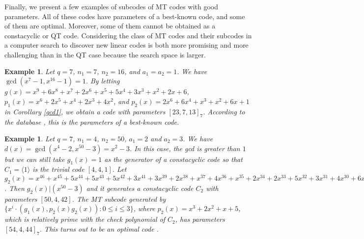 \documentclass[preprint,12pt]{elsarticle}
\newtheorem{Example}[Theorem]{Example}
\begin{document}
Finally, we present a few examples of subcodes of MT codes with good parameters. All of these codes have parameters of a best-known code, and some of them are optimal. Moreover, some of them cannot be obtained as a constacyclic or QT code. Considering the class of MT codes and their subcodes in a computer search to discover new linear codes is both more promising and more challenging than in the QT case because the search space is larger. 

\begin{Example}
Let $q=7$, $n_1=7$, $n_2=16$, and $a_1=a_2=1$. We have $\gcd(x^7-1,x^{16}-1)=1$.
By letting $g(x)= x^9 + 6x^8 + x^7 + 2x^6 + x^5 + 5x^4 + 3x^3 + x^2 + 2x + 6$, 
$p_1(x) =x^6 + 2x^5 + x^4 + 2x^3 + 4x^2$, and $p_2(x) =2x^6 + 6x^4 + x^3 + x^2 + 6x + 1$ in Corollary \ref{gcd1}, we obtain a code with parameters $[23,7,13]_7$. According to the database \cite{table}, this is the parameters of a best-known code. 
\end{Example}


\begin{Example}
Let $q=7$, $n_1=4$, $n_2=50$, $a_1=2$ and $a_2=3$. We have $d(x)=\gcd(x^4-2,x^{50}-3)=x^2-3$. In this case, the gcd is greater than $1$ but we can still take $g_1(x)=1$ as the generator of a constacyclic code so that $C_1=\langle 1 \rangle$ is the trivial code $[4,4,1]$. Let  $g_2(x)= x^{46} + x^{45} + 5x^{44} + 5x^{43} + 5x^{42} + 3x^{41} + 3x^{39} + 2x^{38} + x^{37} + 4x^{36} + x^{35} + 2x^{34} + 2x^{33} + 5x^{32} + 3x^{31} + 4x^{30} + 6x^{29} + 2x^{27} + 5x^{26} + x^{25} + 6x^{24} + 3x^{22} + 5x^{21} + 5x^{20} + 6x^{19} + x^{17} + 2x^{16} + x^{15} + 5x^{14} + 6x^{13} + 4x^{12} + 6x^{11} + 2x^{10} + 5x^9 + 2x^8 + 2x^7 + 
4x^5 + 6x^4 + 4x^3 + 5x^2 + 3x + 2$. Then $g_2(x)|(x^{50}-3)$ and it generates a constacyclic code $C_2$ with parameters $[50,4,42]$.  The MT subcode generated by $\{x^i\cdot (g_1(x), p_2(x)g_2(x)): 0\leq i\leq 3\}$, where $p_2(x) =x^3 + 2x^2 + x + 5$, which is relatively prime with the check polynomial of $C_2$, has parameters $[54,4,44]_7$. This turns out to be an \textit{optimal} code \cite{table}.
\end{Example}
\end{document}
